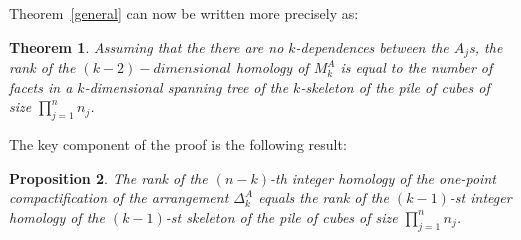 \documentclass{amsart}
\newtheorem{theorem}{Theorem}[section]
\newtheorem{proposition}[theorem]{Proposition}
\begin{document}
Theorem~\ref{general} can now be written more precisely as:

\begin{theorem}
\label{gen}
  Assuming that the there are no $k$-dependences between the $A_j$s, the rank of the $(k-2)-dimensional$ homology of $M^A_k$
  is equal to the number of facets in a $k$-dimensional spanning tree of the $k$-skeleton of the pile of cubes of size $\prod_{j=1}^n n_j$.
\end{theorem}

The key component of the proof is the following result:

\begin{proposition}
  The rank of the $(n-k)$-th integer homology of the one-point compactification of the
  arrangement $\Delta^A_{k}$ equals the rank of the $(k-1)$-st integer homology of the $(k-1)$-st skeleton of the
  pile of cubes of size $\prod_{j=1}^n n_j$.
\end{proposition}
\end{document}
